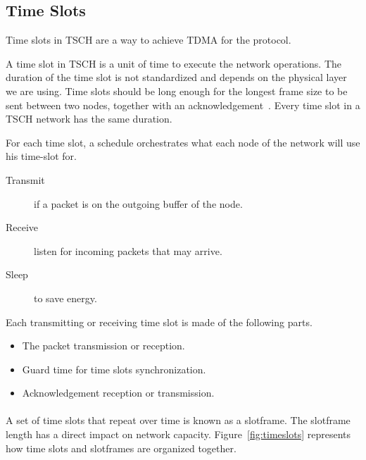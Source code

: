 %


\subsection{Time Slots}

Time slots in TSCH are a way to achieve TDMA for the protocol.

A time slot in TSCH is a unit of time to execute the network operations.
The duration of the time slot is not standardized and depends on the physical
layer we are using.
Time slots should be long enough for the longest frame size to be sent
between two nodes, together with an acknowledgement~\cite{rfc7554}.
Every time slot in a TSCH network has the same duration.

For each time slot, a schedule orchestrates what each
node of the network will use his time-slot for.

\begin{description}
  \item [Transmit] if a packet is on the outgoing buffer of the node.
  \item [Receive] listen for incoming packets that may arrive.
  \item [Sleep] to save energy.
\end{description}

Each transmitting or receiving time slot is made of the following parts.

\begin{itemize}
  \item The packet transmission or reception.
  \item Guard time for time slots synchronization.
  \item Acknowledgement reception or transmission.
\end{itemize}

\paragraph{}

A set of time slots that repeat over time is known as a slotframe.
The slotframe length has a direct impact on network capacity.
Figure~\ref{fig:timeslots} represents how time slots and slotframes are
organized together.

